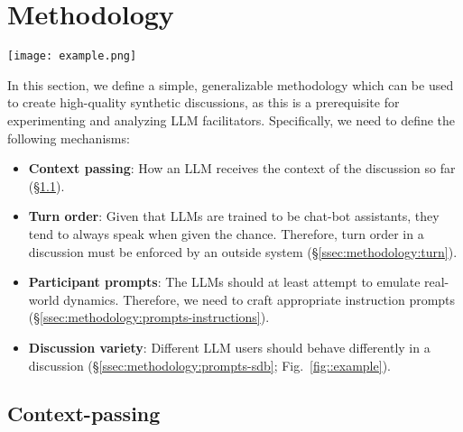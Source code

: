 %

\section{Methodology}
\label{sec:methodology}

 \begin{figure*}[t]
	\centering
	\texttt{[image: example.png]}
	\caption{Excerpt from a synthetic discussion. The LLM participants use their sociodemographic prompts to insert personal stories and justify their perspectives in the discussion. Comments are clipped due to length. @CynicalInvestor88 is also a part of the discussion; not a hallucination.}
	\label{fig::example}
\end{figure*}

In this section, we define a simple, generalizable methodology which can be used to create high-quality synthetic discussions, as this is a prerequisite for experimenting and analyzing LLM facilitators. Specifically, we need to define the following mechanisms:

\begin{itemize}[nosep, noitemsep]
	\item \textbf{Context passing}: How an LLM receives the context of the discussion so far (\S\ref{ssec:methodology:context}).  
	
	\item \textbf{Turn order}: Given that LLMs are trained to be chat-bot assistants, they tend to always speak when given the chance. Therefore, turn order in a discussion must be enforced by an outside system (\S\ref{ssec:methodology:turn}).
	
	\item \textbf{Participant prompts}: The LLMs should at least attempt to emulate real-world dynamics. Therefore, we need to craft appropriate instruction prompts (\S\ref{ssec:methodology:prompts-instructions}).
	
	\item \textbf{Discussion variety}: Different LLM users should behave differently in a discussion (\S\ref{ssec:methodology:prompts-sdb}; Fig.~\ref{fig::example}).
\end{itemize}

\subsection{Context-passing}
\label{ssec:methodology:context}

